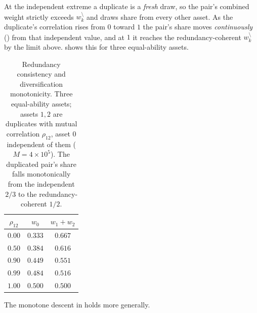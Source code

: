 At the independent extreme a duplicate is a \emph{fresh} draw, so the pair's
combined weight strictly exceeds $w_k^{\setminus}$ and draws share from every
other asset. As the duplicate's correlation rises from $0$ toward $1$
the pair's share moves \emph{continuously} () from that
independent value, and at $1$ it reaches the redundancy-coherent
$w_k^{\setminus}$ by the limit above.  shows this for three equal-ability assets.

\begin{table}[h]
  \centering
  \caption{Redundancy consistency and diversification monotonicity. Three
  equal-ability assets; assets $1,2$ are duplicates with mutual correlation
  $\rho_{12}$, asset $0$ independent of them ($M = 4\times10^5$). The duplicated
  pair's share falls monotonically from the independent $2/3$ to the
  redundancy-coherent $1/2$.}
  \label{tab:redundancy}
  \begin{tabular}{ccc}
    \toprule
    $\rho_{12}$ & $w_0$ & $w_1 + w_2$ \\
    \midrule
    $0.00$ & $0.333$ & $0.667$ \\
    $0.50$ & $0.384$ & $0.616$ \\
    $0.90$ & $0.449$ & $0.551$ \\
    $0.99$ & $0.484$ & $0.516$ \\
    $1.00$ & $0.500$ & $0.500$ \\
    \bottomrule
  \end{tabular}
\end{table}

The monotone descent in  holds more generally.

